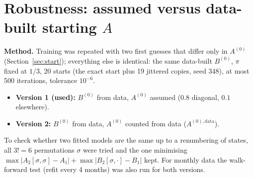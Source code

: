 \documentclass[11pt]{article}
\begin{document}
\section{Robustness: assumed versus data-built starting $A$}\label{sec:initrobust}

\textbf{Method.} Training was repeated with two first guesses that differ only in $A^{(0)}$ (Section~\ref{sec:start}); everything else is identical: the same data-built $B^{(0)}$, $\pi$ fixed at $1/3$, 20 starts (the exact start plus 19 jittered copies, seed 348), at most 500 iterations, tolerance $10^{-6}$.
\begin{itemize}
\item \textbf{Version 1 (used):} $B^{(0)}$ from data, $A^{(0)}$ assumed ($0.8$ diagonal, $0.1$ elsewhere).
\item \textbf{Version 2:} $B^{(0)}$ from data, $A^{(0)}$ counted from data ($A^{(0),\text{data}}$).
\end{itemize}
To check whether two fitted models are the same up to a renumbering of states, all $3!=6$ permutations $\sigma$ were tried and the one minimising $\max|A_2[\sigma,\sigma]-A_1|+\max|B_2[\sigma,\cdot]-B_1|$ kept. For monthly data the walk-forward test (refit every 4 months) was also run for both versions.
\end{document}

